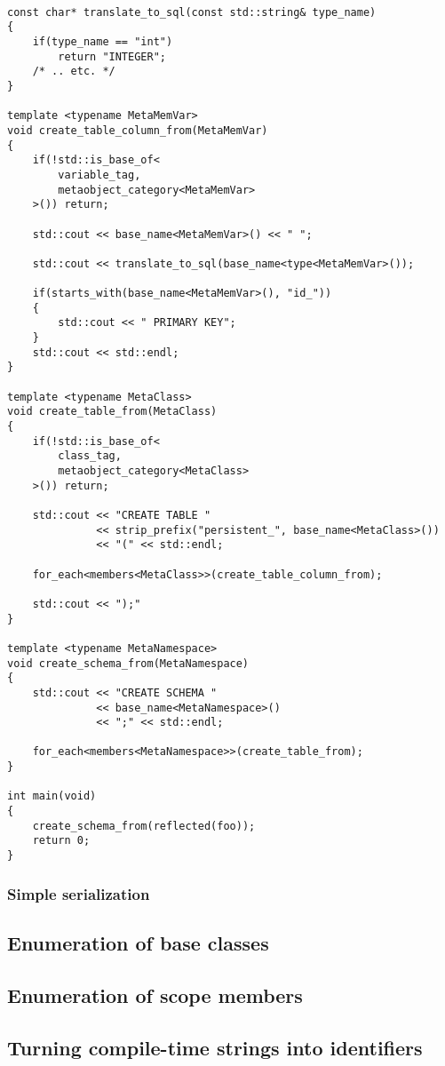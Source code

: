 \begin{verbatim}

const char* translate_to_sql(const std::string& type_name)
{
	if(type_name == "int")
		return "INTEGER";
	/* .. etc. */
}

template <typename MetaMemVar>
void create_table_column_from(MetaMemVar)
{
	if(!std::is_base_of<
		variable_tag,
		metaobject_category<MetaMemVar>
	>()) return;

	std::cout << base_name<MetaMemVar>() << " ";

	std::cout << translate_to_sql(base_name<type<MetaMemVar>());

	if(starts_with(base_name<MetaMemVar>(), "id_"))
	{
		std::cout << " PRIMARY KEY";
	}
	std::cout << std::endl;
}

template <typename MetaClass>
void create_table_from(MetaClass)
{
	if(!std::is_base_of<
		class_tag,
		metaobject_category<MetaClass>
	>()) return;

	std::cout << "CREATE TABLE "
	          << strip_prefix("persistent_", base_name<MetaClass>())
	          << "(" << std::endl;

	for_each<members<MetaClass>>(create_table_column_from);

	std::cout << ");"
}

template <typename MetaNamespace>
void create_schema_from(MetaNamespace)
{
	std::cout << "CREATE SCHEMA "
	          << base_name<MetaNamespace>()
	          << ";" << std::endl;

	for_each<members<MetaNamespace>>(create_table_from);
}

int main(void)
{
	create_schema_from(reflected(foo));
	return 0;
}

\end{verbatim}

\subsubsection{Simple serialization}




\subsection{Enumeration of base classes}

\subsection{Enumeration of scope members}

\subsection{Turning compile-time strings into identifiers}

